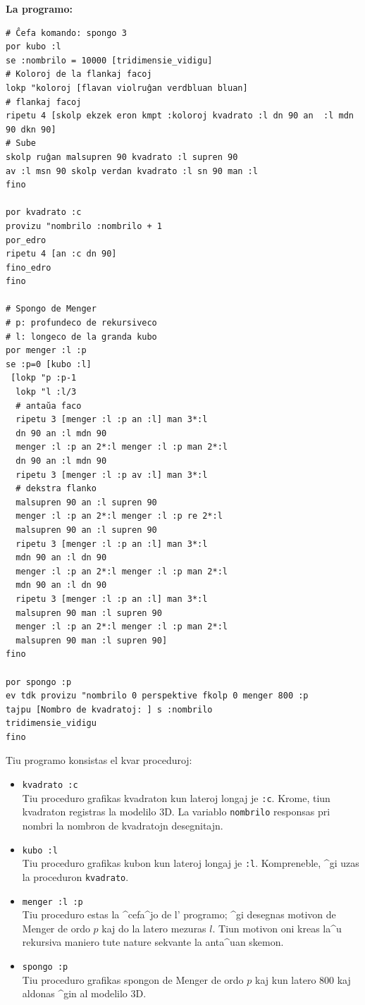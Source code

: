 \textbf{La programo:}

\begin{verbatim}
# Ĉefa komando: spongo 3
por kubo :l
se :nombrilo = 10000 [tridimensie_vidigu]
# Koloroj de la flankaj facoj
lokp "koloroj [flavan violruĝan verdbluan bluan]
# flankaj facoj
ripetu 4 [skolp ekzek eron kmpt :koloroj kvadrato :l dn 90 an  :l mdn 90 dkn 90]
# Sube
skolp ruĝan malsupren 90 kvadrato :l supren 90
av :l msn 90 skolp verdan kvadrato :l sn 90 man :l
fino

por kvadrato :c
provizu "nombrilo :nombrilo + 1
por_edro
ripetu 4 [an :c dn 90]
fino_edro
fino

# Spongo de Menger
# p: profundeco de rekursiveco
# l: longeco de la granda kubo
por menger :l :p
se :p=0 [kubo :l] 
 [lokp "p :p-1  
  lokp "l :l/3
  # antaŭa faco
  ripetu 3 [menger :l :p an :l] man 3*:l
  dn 90 an :l mdn 90
  menger :l :p an 2*:l menger :l :p man 2*:l
  dn 90 an :l mdn 90
  ripetu 3 [menger :l :p av :l] man 3*:l
  # dekstra flanko
  malsupren 90 an :l supren 90 
  menger :l :p an 2*:l menger :l :p re 2*:l
  malsupren 90 an :l supren 90 
  ripetu 3 [menger :l :p an :l] man 3*:l
  mdn 90 an :l dn 90
  menger :l :p an 2*:l menger :l :p man 2*:l
  mdn 90 an :l dn 90
  ripetu 3 [menger :l :p an :l] man 3*:l
  malsupren 90 man :l supren 90
  menger :l :p an 2*:l menger :l :p man 2*:l
  malsupren 90 man :l supren 90]
fino

por spongo :p
ev tdk provizu "nombrilo 0 perspektive fkolp 0 menger 800 :p 
tajpu [Nombro de kvadratoj: ] s :nombrilo
tridimensie_vidigu
fino
\end{verbatim}

Tiu programo konsistas el kvar proceduroj:
\begin{itemize}
\item \texttt{kvadrato :c}\\
  Tiu proceduro grafikas kvadraton kun lateroj longaj je \texttt{:c}.
  Krome, tiun kvadraton registras la modelilo 3D.  La variablo
  \texttt{nombrilo} responsas pri nombri la nombron de kvadratojn
  desegnitajn.
\item \texttt{kubo :l}\\
  Tiu proceduro grafikas kubon kun lateroj longaj je \texttt{:l}.
  Kompreneble, ^gi uzas la proceduron \texttt{kvadrato}.
\item \texttt{menger :l :p}\\
  Tiu proceduro estas la ^cefa^jo de l' programo; ^gi desegnas motivon
  de Menger de ordo $p$ kaj do la latero mezuras $l$.  Tiun motivon
  oni kreas la^u rekursiva maniero tute nature sekvante la anta^uan
  skemon.
\item \texttt{spongo :p}\\
  Tiu proceduro grafikas spongon de Menger de ordo $p$ kaj kun latero
  $800$ kaj aldonas ^gin al modelilo 3D.
\end{itemize}
\vfill
\pagebreak

